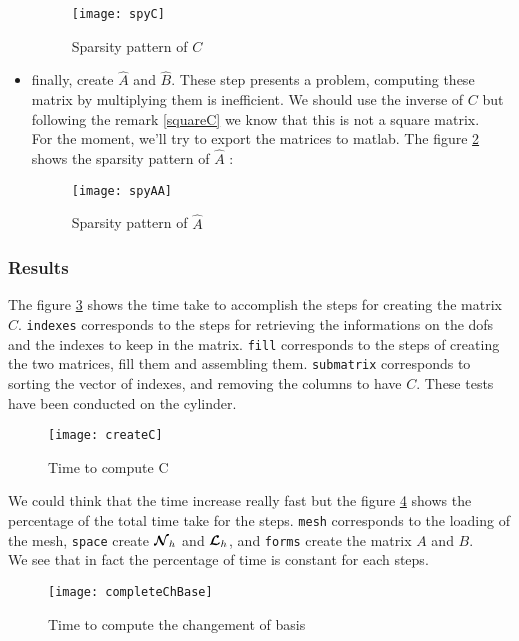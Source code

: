 \begin{itemize}
\begin{figure}[H]
\centering
\texttt{[image: spyC]}
\caption{Sparsity pattern of $C$}
\label{spyC}
\end{figure}
\item finally, create $\widehat{A}$ and $\widehat{B}$. These step presents a
  problem, computing these matrix by multiplying them is inefficient. We should
  use the inverse of $C$ but following the remark \ref{squareC} we know that this is not a square matrix.\\
For the moment, we'll try to export the matrices to matlab.
The figure \ref{spyAA} shows the sparsity pattern of $\widehat{A}$ : 
\begin{figure}[H]
\centering
\texttt{[image: spyAA]}
\caption{Sparsity pattern of $\widehat{A}$}
\label{spyAA}
\end{figure}
\end{itemize}

\subsubsection{Results}

The figure \ref{timeC} shows the time take to accomplish the steps for creating the matrix $C$. \texttt{indexes} corresponds to the steps for retrieving the informations on the dofs and the indexes to keep in the matrix. \texttt{fill} corresponds to the steps of creating the two matrices, fill them and assembling them. \texttt{submatrix} corresponds to sorting the vector of indexes, and removing the columns to have $C$. These tests have been conducted on the cylinder.\\

\begin{figure}[H]
\centering
\texttt{[image: createC]}
\caption{Time to compute C}
\label{timeC}
\end{figure}

We could think that the time increase really fast but the figure \ref{completeTime} shows the percentage of the total time take for the steps. \texttt{mesh} corresponds to the loading of the mesh, \texttt{space} create ${\bm{\mathcal{N}}}_h$ and ${\bm{\mathcal{L}}}_h$, and \texttt{forms} create the matrix $A$ and $B$.\\
We see that in fact the percentage of time is constant for each steps.

\begin{figure}[H]
\centering
\texttt{[image: completeChBase]}
\caption{Time to compute the changement of basis}
\label{completeTime}
\end{figure}

